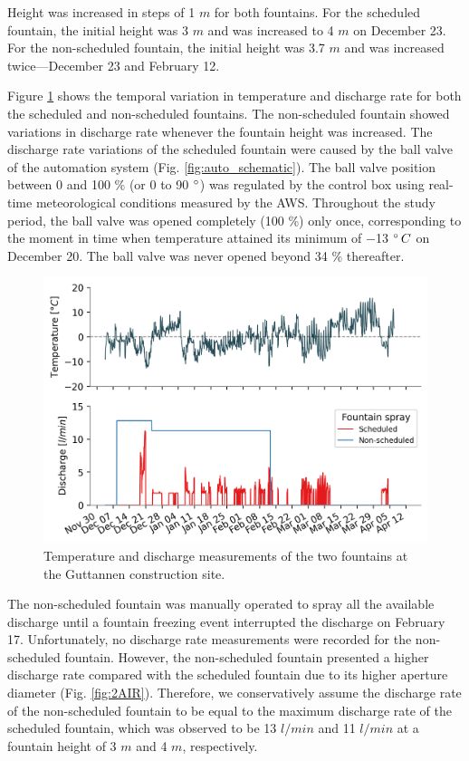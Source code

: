 \documentclass[tc, manuscript]{copernicus}
\begin{document}
Height was increased in steps of 1 $m$ for both fountains. For the scheduled fountain, the initial height was 3
$m$ and was increased to 4 $m$ on December 23. For the non-scheduled fountain, the initial height was 3.7 $m$ and
was increased twice---December 23 and February 12.

Figure \ref{fig:aws} shows the temporal variation in temperature and discharge rate for both the scheduled and
non-scheduled fountains. The non-scheduled fountain showed variations in discharge rate whenever the fountain height
was increased. The discharge rate variations of the scheduled fountain were caused by the ball valve of the
automation system (Fig. \ref{fig:auto_schematic}). The ball valve position between 0 and 100 \% (or 0 to 90
$^{\circ}$) was regulated by the control box using real-time meteorological conditions measured by the AWS.
Throughout the study period, the ball valve was opened completely (100 \%) only once, corresponding to the
moment in time when temperature attained its minimum of $-$13 $^{\circ} \, C$ on December 20. The ball valve
was never opened beyond 34 \% thereafter.  

\begin{figure}
\includegraphics[width=12cm]{Figures/disvstemp.png}
\caption{Temperature and discharge measurements of the two fountains at the Guttannen construction site.}
\label{fig:aws} 
\end{figure}

The non-scheduled fountain was manually operated to spray all the available discharge until a fountain freezing
event interrupted the discharge on February 17. Unfortunately, no discharge rate measurements were recorded for
the non-scheduled fountain. However, the non-scheduled fountain presented a higher discharge rate compared with the
scheduled fountain due to its higher aperture diameter (Fig. \ref{fig:2AIR}). Therefore, we conservatively assume
the discharge rate of the non-scheduled fountain to be equal to the maximum discharge rate of the scheduled
fountain, which was observed to be 13 $l/min$ and 11 $l/min$ at a fountain height of 3 $m$ and 4 $m$,
respectively.
\end{document}
